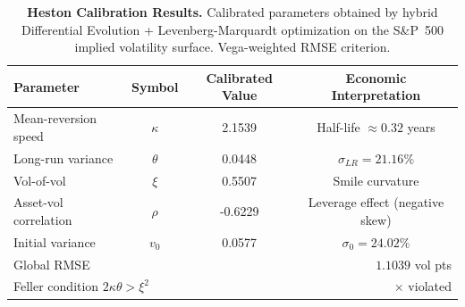 \begin{table}[h!]
\centering
\begin{tabular}{lccc}
\toprule
\textbf{Parameter} & \textbf{Symbol} & \textbf{Calibrated Value} & \textbf{Economic Interpretation} \\
\midrule
Mean-reversion speed  & $\kappa$ & 2.1539 & Half-life $\approx 0.32$ years \\
Long-run variance     & $\theta$ & 0.0448 & $\sigma_{LR} = 21.16\%$ \\
Vol-of-vol            & $\xi$    & 0.5507 & Smile curvature \\
Asset-vol correlation & $\rho$   & -0.6229 & Leverage effect (negative skew) \\
Initial variance      & $v_0$    & 0.0577 & $\sigma_0 = 24.02\%$ \\
\midrule
\multicolumn{2}{l}{Global RMSE} & \multicolumn{2}{r}{$1.1039$ vol pts} \\
\multicolumn{2}{l}{Feller condition $2\kappa\theta > \xi^2$} & \multicolumn{2}{r}{$\times$ violated} \\
\bottomrule
\end{tabular}
\caption{\textbf{Heston Calibration Results.}
Calibrated parameters obtained by hybrid Differential Evolution +
Levenberg-Marquardt optimization on the S\&P~500 implied volatility surface.
Vega-weighted RMSE criterion.}
\label{tab:calibration_results}
\end{table}